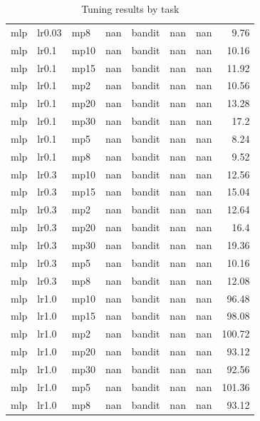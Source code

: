 \begin{table}[t]
\begin{tabular}{lllrrrrr}
mlp & lr0.03 & mp8 & nan & bandit & nan & nan & 9.76 \\
mlp & lr0.1 & mp10 & nan & bandit & nan & nan & 10.16 \\
mlp & lr0.1 & mp15 & nan & bandit & nan & nan & 11.92 \\
mlp & lr0.1 & mp2 & nan & bandit & nan & nan & 10.56 \\
mlp & lr0.1 & mp20 & nan & bandit & nan & nan & 13.28 \\
mlp & lr0.1 & mp30 & nan & bandit & nan & nan & 17.2 \\
mlp & lr0.1 & mp5 & nan & bandit & nan & nan & 8.24 \\
mlp & lr0.1 & mp8 & nan & bandit & nan & nan & 9.52 \\
mlp & lr0.3 & mp10 & nan & bandit & nan & nan & 12.56 \\
mlp & lr0.3 & mp15 & nan & bandit & nan & nan & 15.04 \\
mlp & lr0.3 & mp2 & nan & bandit & nan & nan & 12.64 \\
mlp & lr0.3 & mp20 & nan & bandit & nan & nan & 16.4 \\
mlp & lr0.3 & mp30 & nan & bandit & nan & nan & 19.36 \\
mlp & lr0.3 & mp5 & nan & bandit & nan & nan & 10.16 \\
mlp & lr0.3 & mp8 & nan & bandit & nan & nan & 12.08 \\
mlp & lr1.0 & mp10 & nan & bandit & nan & nan & 96.48 \\
mlp & lr1.0 & mp15 & nan & bandit & nan & nan & 98.08 \\
mlp & lr1.0 & mp2 & nan & bandit & nan & nan & 100.72 \\
mlp & lr1.0 & mp20 & nan & bandit & nan & nan & 93.12 \\
mlp & lr1.0 & mp30 & nan & bandit & nan & nan & 92.56 \\
mlp & lr1.0 & mp5 & nan & bandit & nan & nan & 101.36 \\
mlp & lr1.0 & mp8 & nan & bandit & nan & nan & 93.12 \\
\bottomrule
\end{tabular}
\caption{Tuning results by task}
\label{tab:tuning_by_task}
\end{table}